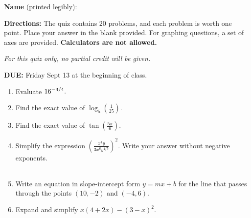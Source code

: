 \documentclass[12pt]{article}
\begin{document}
\textbf{Name} (printed legibly): \fbox{\strut\hspace{4in} }

\textbf{Directions:} The quiz contains 20 problems, and each problem is worth one point. Place your answer in the blank provided. For graphing questions, a set of axes are provided. {\bf Calculators are not allowed.}%

{\em For this quiz only, no partial credit will be given.}

\textbf{DUE: } Friday Sept 13 at the beginning of class.
\begin{enumerate}
\item Evaluate ${\large{16^{-3/4}}}.$

\quad \hfill \underline{\hspace{2in}}
\vfill

\item Find the exact value of  ${\displaystyle{\log_{5}\left({\frac{1}{25}}\right)}}.$

\quad \hfill \underline{\hspace{2in}}
\vfill

\item Find the exact value of $\displaystyle{\tan \left(\frac{ 5 \pi}{ 6}\right)}.$

\quad \hfill \underline{\hspace{2in}}
\vfill

\item  Simplify the expression $\displaystyle{\left(\frac{x^{4}y}{3x^6y^{4/5}} \right)^2}$. Write your answer without negative exponents.\\
\quad \\

\quad \hfill \underline{\hspace{2in}}
\vfill

\item Write an equation in slope-intercept form $y=mx+b$ for the line that passes through the points $(10,-2)$ and $(-4,6)$.\\

\quad \hfill \underline{\hspace{2in}}
\vfill
\newpage

\item Expand and simplify $x(4+2x)-(3-x)^2.$\\

\quad \hfill \underline{\hspace{2in}}
\vfill


\end{enumerate}
\end{document}
